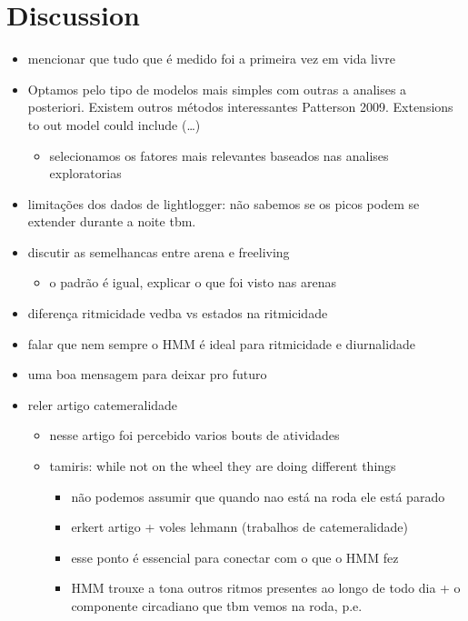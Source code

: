 \documentclass[msc,numbers,hidelinks]{coppe}
\providecommand{\tightlist}{
  \setlength{\itemsep}{0pt}\setlength{\parskip}{0pt}}
\begin{document}
  \hypertarget{discussion}{%
  \section{Discussion}\label{discussion}}
  \begin{itemize}
  \item
    mencionar que tudo que é medido foi a primeira vez em vida livre
  \item
    Optamos pelo tipo de modelos mais simples com outras a analises a posteriori. Existem outros métodos interessantes Patterson 2009. Extensions to out model could include (\ldots)
    \begin{itemize}
    \tightlist
    \item
      selecionamos os fatores mais relevantes baseados nas analises exploratorias
    \end{itemize}
  \item
    limitações dos dados de lightlogger: não sabemos se os picos podem se extender durante a noite tbm.
  \item
    discutir as semelhancas entre arena e freeliving
    \begin{itemize}
    \tightlist
    \item
      o padrão é igual, explicar o que foi visto nas arenas
    \end{itemize}
  \item
    diferença ritmicidade vedba vs estados na ritmicidade
  \item
    falar que nem sempre o HMM é ideal para ritmicidade e diurnalidade
  \item
    uma boa mensagem para deixar pro futuro
  \item
    reler artigo catemeralidade
    \begin{itemize}
    \item
      nesse artigo foi percebido varios bouts de atividades
    \item
      tamiris: while not on the wheel they are doing different things
      \begin{itemize}
      \tightlist
      \item
        não podemos assumir que quando nao está na roda ele está parado
      \item
        erkert artigo + voles lehmann (trabalhos de catemeralidade)
      \item
        esse ponto é essencial para conectar com o que o HMM fez
      \item
        HMM trouxe a tona outros ritmos presentes ao longo de todo dia + o componente circadiano que tbm vemos na roda, p.e.

\end{itemize}
\end{itemize}
\end{itemize}
\end{document}
